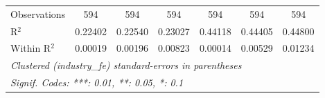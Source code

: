 \begin{tabular}{lcccccc}
   Observations                            & 594      & 594           & 594      & 594      & 594            & 594\\  
   R$^2$                                   & 0.22402  & 0.22540       & 0.23027  & 0.44118  & 0.44405        & 0.44800\\  
   Within R$^2$                            & 0.00019  & 0.00196       & 0.00823  & 0.00014  & 0.00529        & 0.01234\\  
   \midrule \midrule
   \multicolumn{7}{l}{\emph{Clustered (industry\_fe) standard-errors in parentheses}}\\
   \multicolumn{7}{l}{\emph{Signif. Codes: ***: 0.01, **: 0.05, *: 0.1}}\\
\end{tabular}
\par\endgroup

